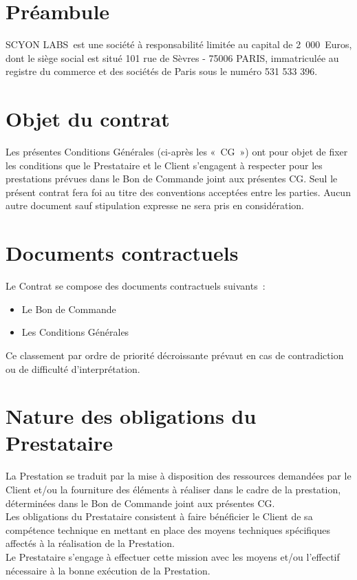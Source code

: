 \documentclass[8pt,french]{base}
\def \companyname {SCYON LABS}
\begin{document}

\begin{multicols*}{3}

\section*{Préambule}

\companyname\ est une société à responsabilité limitée au capital de 2~000~Euros, dont le siège social est situé 101 rue de Sèvres - 75006 PARIS, immatriculée au registre du commerce et des sociétés de Paris sous le numéro  531 533 396.

\section{Objet du contrat}

Les présentes Conditions Générales (ci-après les «~CG~») ont pour objet de fixer les conditions que le Prestataire et le Client s’engagent à respecter pour les prestations prévues dans le Bon de Commande joint aux présentes CG. Seul le présent contrat fera foi au titre des conventions acceptées entre les parties. Aucun autre document sauf stipulation expresse ne sera pris en considération.

\section{Documents contractuels}

Le Contrat se compose des documents contractuels suivants~:
\begin{itemize}
  \item Le Bon de Commande
  \item Les Conditions Générales
\end{itemize}
Ce classement par ordre de priorité décroissante prévaut en cas de contradiction ou de difficulté d’interprétation.

\section{Nature des obligations du Prestataire}

La Prestation se traduit par la mise à disposition des ressources demandées par le Client et/ou la fourniture des éléments à réaliser dans le cadre de la prestation, déterminées dans le Bon de Commande joint aux présentes CG. \\
Les obligations du Prestataire consistent à faire bénéficier le Client de sa compétence technique en mettant en place des moyens techniques spécifiques affectés à la réalisation de la Prestation. \\
Le Prestataire s’engage à effectuer cette mission avec les moyens et/ou l’effectif nécessaire à la bonne exécution de la Prestation.


\end{multicols*}
\end{document}
